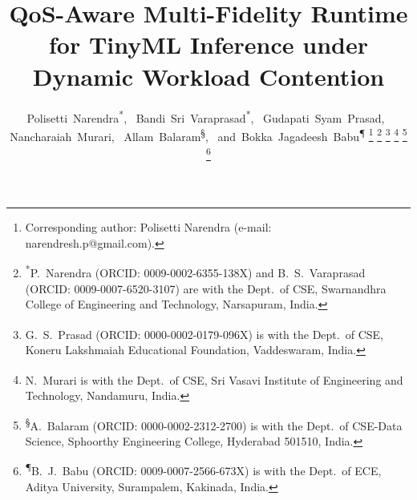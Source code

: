\documentclass[journal]{IEEEtran}
\begin{document}
\title{QoS-Aware Multi-Fidelity Runtime for TinyML Inference under Dynamic Workload Contention}

\author{Polisetti~Narendra\textsuperscript{*},~%
Bandi~Sri~Varaprasad\textsuperscript{*},~%
Gudapati~Syam~Prasad\textsuperscript{\dag},~%
Nancharaiah~Murari\textsuperscript{\ddag},~%
Allam~Balaram\textsuperscript{\S},~%
and~Bokka~Jagadeesh~Babu\textsuperscript{\P}%
\thanks{Corresponding author: Polisetti Narendra (e-mail: narendresh.p@gmail.com).}%
\thanks{\textsuperscript{*}P.~Narendra (ORCID: 0009-0002-6355-138X) and B.~S.~Varaprasad (ORCID: 0009-0007-6520-3107) are with the Dept.\ of CSE, Swarnandhra College of Engineering and Technology, Narsapuram, India.}%
\thanks{\textsuperscript{\dag}G.~S.~Prasad (ORCID: 0000-0002-0179-096X) is with the Dept.\ of CSE, Koneru Lakshmaiah Educational Foundation, Vaddeswaram, India.}%
\thanks{\textsuperscript{\ddag}N.~Murari is with the Dept.\ of CSE, Sri Vasavi Institute of Engineering and Technology, Nandamuru, India.}%
\thanks{\textsuperscript{\S}A.~Balaram (ORCID: 0000-0002-2312-2700) is with the Dept.\ of CSE-Data Science, Sphoorthy Engineering College, Hyderabad 501510, India.}%
\thanks{\textsuperscript{\P}B.~J.~Babu (ORCID: 0009-0007-2566-673X) is with the Dept.\ of ECE, Aditya University, Surampalem, Kakinada, India.}%
}
\end{document}
